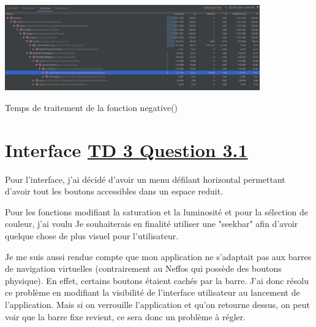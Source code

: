 \documentclass{article}
\begin{document}
\begin{center} 
    \includegraphics[width=11cm]{../Image_temps/TempsNegative}

    Temps de traitement de la fonction negative()
\end{center}

\newpage
\section{Interface \underline{TD 3 Question 3.1}}
Pour l'interface, j'ai décidé d'avoir un menu défilant horizontal permettant d'avoir tout les boutons accessibles dans un espace reduit.
\bigbreak 

Pour les fonctions modifiant la saturation et la luminosité et pour la sélection de couleur, j'ai voulu
Je souhaiterais en finalité utiliser une "seekbar" afin d'avoir quelque chose de plus visuel pour l'utilisateur.
\bigbreak

Je me suis aussi rendue compte que mon application ne s’adaptait pas aux barres de navigation virtuelles (contrairement au Neffos qui possède des boutons physique). En effet, certains boutons étaient cachés par la barre. 
J'ai donc résolu ce problème en modifiant la visibilité de l'interface utilisateur au lancement de l'application. Mais si on verrouille l'application et qu'on retourne dessus, on peut voir que la barre fixe revient, ce sera donc un problème à régler.
\end{document}

